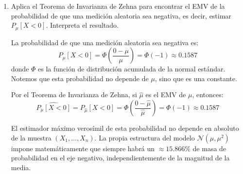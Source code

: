 \begin{ejercicio}
\begin{enumerate}
        El EMV de $\mu$ es una combinación de los dos estimadores obtenidos por el método de los momentos, lo que significa que el EMV ``fusiona'' la información de ambos estimadores. En particular, el EMV toma en cuenta tanto la media muestral como el segundo momento muestral para proporcionar una estimación más precisa del parámetro $\mu$.


        \item Aplica el Teorema de Invarianza de Zehna para encontrar el EMV de la probabilidad de que una medición aleatoria sea negativa, es decir, estimar $P_\mu[X < 0]$. Interpreta el resultado.
        
        La probabilidad de que una medición aleatoria sea negativa es:
        \begin{equation*}
            P_\mu[X < 0] = \Phi\left(\frac{0 - \mu}{\mu}\right) = \Phi(-1) \approx 0.1587
        \end{equation*}
        donde $\Phi$ es la función de distribución acumulada de la normal estándar. Notemos que esta probabilidad no depende de $\mu$, sino que es una constante.

        Por el Teorema de Invarianza de Zehna, si $\widehat{\mu}$ es el EMV de $\mu$, entonces:
        \begin{equation*}
            \widehat{P_\mu[X < 0]} = P_{\widehat{\mu}}[X < 0] = \Phi\left(\frac{0 - \widehat{\mu}}{\widehat{\mu}}\right) = \Phi(-1) \approx 0.1587
        \end{equation*}

        El estimador máximo verosímil de esta probabilidad no depende en absoluto de la muestra $(X_1, \dots, X_n)$. La propia estructura del modelo $\mathcal{N}(\mu, \mu^2)$ impone matemáticamente que siempre habrá un $\approx 15.866\%$ de masa de probabilidad en el eje negativo, independientemente de la magnitud de la media.
    \end{enumerate}
\end{ejercicio}